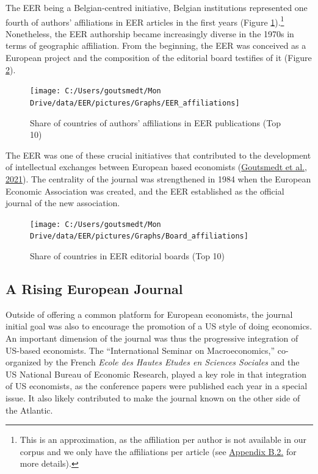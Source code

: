 \documentclass[]{elsarticle} %
\begin{document}
The EER being a Belgian-centred initiative, Belgian institutions
represented one fourth of authors' affiliations in EER articles in the
first years (Figure \ref{fig:plot-authors}).\footnote{This is an
  approximation, as the affiliation per author is not available in our
  corpus and we only have the affiliations per article (see
  \protect\hyperlink{author-affiliation}{Appendix B.2.} for more
  details).} Nonetheless, the EER authorship became increasingly diverse
in the 1970s in terms of geographic affiliation. From the beginning, the
EER was conceived as a European project and the composition of the
editorial board testifies of it (Figure \ref{fig:plot-boards}).

\begin{figure}[h]

{\centering \texttt{[image: C:/Users/goutsmedt/Mon Drive/data/EER/pictures/Graphs/EER\_affiliations]} 

}

\caption{Share of countries of authors' affiliations in EER publications (Top 10)}\label{fig:plot-authors}
\end{figure}

The EER was one of these crucial initiatives that contributed to the
development of intellectual exchanges between European based economists
(\protect\hyperlink{ref-goutsmedt2021}{Goutsmedt et al., 2021}). The
centrality of the journal was strengthened in 1984 when the European
Economic Association was created, and the EER established as the
official journal of the new association.

\begin{figure}[h]

{\centering \texttt{[image: C:/Users/goutsmedt/Mon Drive/data/EER/pictures/Graphs/Board\_affiliations]} 

}

\caption{Share of countries in EER editorial boards (Top 10)}\label{fig:plot-boards}
\end{figure}

\hypertarget{rising-journal}{%
\subsection{A Rising European Journal}\label{rising-journal}}

Outside of offering a common platform for European economists, the
journal initial goal was also to encourage the promotion of a US style
of doing economics. An important dimension of the journal was thus the
progressive integration of US-based economists. The ``International
Seminar on Macroeconomics,'' co-organized by the French \emph{Ecole des
Hautes Etudes en Sciences Sociales} and the US National Bureau of
Economic Research, played a key role in that integration of US
economists, as the conference papers were published each year in a
special issue. It also likely contributed to make the journal known on
the other side of the Atlantic.
\end{document}
